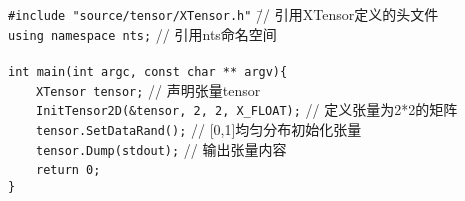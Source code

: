 \begin{tcolorbox}[enhanced,width=12cm,frame engine=empty,boxrule=0.1mm,size=title,colback=blue!10!white]
\begin{flushleft}
{\scriptsize
\begin{tabbing}
\texttt{\#include "source/tensor/XTensor.h"} \hspace{6em} \= // 引用XTensor定义的头文件 \\

\texttt{using namespace nts;} \> // 引用nts命名空间 \\
\ \\

\texttt{int main(int argc, const char ** argv)\{} \\
\ \ \ \ \texttt{XTensor tensor;} \> // 声明张量tensor \\

\ \ \ \ \texttt{InitTensor2D(\&tensor, 2, 2, X\_FLOAT);} \> // 定义张量为2*2的矩阵 \\

\ \ \ \ \texttt{tensor.SetDataRand();} \> // [0,1]均匀分布初始化张量 \\

\ \ \ \ \texttt{tensor.Dump(stdout);} \> // 输出张量内容 \\

\ \ \ \ \texttt{return 0;}\\
\texttt{\}}

\end{tabbing}
}
\end{flushleft}
\end{tcolorbox}

